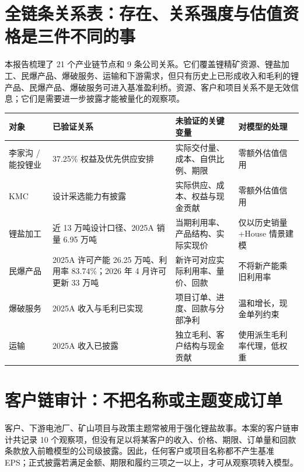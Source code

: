 \section{全链条关系表：存在、关系强度与估值资格是三件不同的事}

本报告梳理了 21 个产业链节点和 9 条公司关系。它们覆盖锂精矿资源、锂盐加工、民爆产品、爆破服务、运输和下游需求，但只有历史上已形成收入和毛利的锂产品、民爆产品、爆破服务可进入基准盈利桥。资源、客户和项目关系不是无效信息；它们是需要进一步披露才能被量化的观察项。

\begin{exhibitbox}[表 A-7：关键资源与产业关系的证据矩阵]
\begin{tabularx}{\exhibitboxwidth}{L{2.7cm}L{2.5cm}L{2.5cm}X}
\toprule
对象 & 已验证关系 & 未验证的关键变量 & 对模型的处理 \\
\midrule
李家沟 / 能投锂业 & 37.25\% 权益及优先供应安排 & 实际交付量、成本、自供比例、期限 & 零额外估值信用 \\
KMC & 设计采选能力有披露 & 实际供应、成本、权益与现金贡献 & 零额外估值信用 \\
锂盐加工 & 近 13 万吨设计口径、2025A 销量 6.95 万吨 & 当期利用率、产品结构、实际实现价 & 仅以历史销量+House 情景建模 \\
民爆产品 & 2025A 许可产能 26.25 万吨、利用率 83.74\%；2026 年 4 月许可更新 33 万吨 & 新许可对应实际利用率、量价、回款 & 不将新产能乘旧利用率 \\
爆破服务 & 2025A 收入与毛利已实现 & 项目订单、进度、回款与分部净利 & 温和增长，现金单列约束 \\
运输 & 2025A 收入已披露 & 独立毛利、客户结构与现金贡献 & 使用派生毛利率代理，低权重 \\
\bottomrule
\end{tabularx}
\end{exhibitbox}

\section{客户链审计：不把名称或主题变成订单}

客户、下游电池厂、矿山项目与政策主题常被用于强化锂盐故事。本案的客户链审计共记录 10 个观察项，但没有足以将某客户的收入、价格、期限、订单量和回款条款放入前瞻模型的公司级披露。因此，任何客户或项目名称都不产生基准 EPS；正式披露若满足金额、期限和履约三项之一以上，才可从观察项转入模型。

